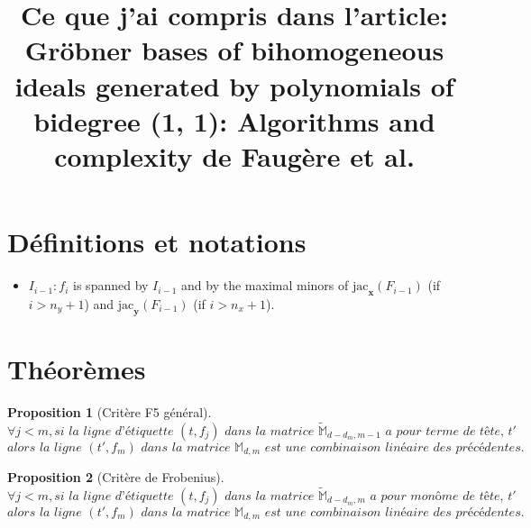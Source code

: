 \documentclass[french]{article}
\title{Ce que j'ai compris dans l'article: Gröbner bases of bihomogeneous ideals generated by polynomials of bidegree (1, 1): Algorithms and complexity de Faugère et al.}
\newtheorem{proposition}{Proposition}[section]
\newcommand{\propositionTitre}[2]{
	\begin{proposition}[#1]
		#2
	\end{proposition}
}
\begin{document}
\maketitle

\section{Définitions et notations}
\begin{itemize}
\item $I_{i-1}:f_i$ is spanned by $I_{i-1}$ and by the maximal minors of $\text{jac}_{\textbf{x}}(F_{i-1})$ (if $i > n_y + 1$) and $\text{jac}_{\textbf{y}}(F_{i-1})$ (if $i > n_x + 1$).
\end{itemize}

\section{Théorèmes}
\propositionTitre{Critère F5 général}{
$$\forall j < m, \textit{si la ligne d'étiquette }(t,f_j) \textit{ dans la matrice } 
\tilde{\mathbb{M}}_{d-d_m, m-1} \textit{ a pour terme de tête, } t'$$
$$	\textit{alors la ligne } 
(t', f_m) \textit{ dans la matrice } \mathbb{M}_{d, m} \textit{ est une combinaison linéaire des précédentes.}$$
}

\propositionTitre{Critère de Frobenius}{
$$\forall j < m, \textit{si la ligne d'étiquette }(t,f_j) \textit{ dans la matrice } 
\tilde{\mathbb{M}}_{d-d_m, m} \textit{ a pour monôme de tête, } t'$$
$$	\textit{alors la ligne } 
(t', f_m) \textit{ dans la matrice } \mathbb{M}_{d, m} \textit{ est une combinaison linéaire des précédentes.}$$
}
\end{document}
